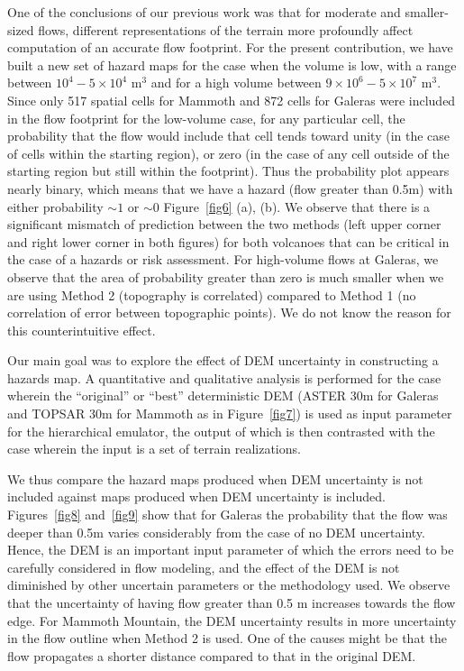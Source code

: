 \documentclass[12pt]{article}
\begin{document}
One of the conclusions of our previous work was that for moderate and
smaller-sized flows, different representations of the terrain more
profoundly affect computation of an accurate flow footprint.  For the
present contribution, we have built a new set of hazard maps for the
case when the volume is low, with a range between $10^4 - 5\times
10^4$ m$^3$ and for a high volume between $9\times 10^6 - 5\times
10^7$ m$^3$.  Since only 517 spatial cells for Mammoth and 872 cells
for Galeras were included in the flow footprint for the low-volume
case, for any particular cell, the probability that the flow would
include that cell tends toward unity (in the case of cells within the
starting region), or zero (in the case of any cell outside of the
starting region but still within the footprint).  Thus the probability
plot appears nearly binary, which means that we have a hazard (flow
greater than 0.5m) with either probability $\sim1$ or $\sim0$
Figure~\ref{fig6} (a), (b).  We observe that there is a significant
mismatch of prediction between the two methods (left upper corner and
right lower corner in both figures) for both volcanoes that can be
critical in the case of a hazards or risk assessment.  For high-volume
flows at Galeras, we observe that the area of probability greater than
zero is much smaller when we are using Method 2 (topography is
correlated) compared to Method 1 (no correlation of error between
topographic points). We do not know the reason for this
counterintuitive effect.

Our main goal was to explore the effect of DEM uncertainty in
constructing a hazards map.  A quantitative and qualitative analysis
is performed for the case wherein the ``original'' or ``best''
deterministic DEM (ASTER 30m for Galeras and TOPSAR 30m for Mammoth as
in Figure~\ref{fig7}) is used as input parameter for the hierarchical
emulator, the output of which is then contrasted with the case wherein
the input is a set of terrain realizations.

We thus compare the hazard maps produced when DEM uncertainty is not
included against maps produced when DEM uncertainty is included.
Figures~\ref{fig8} and~\ref{fig9} show that for Galeras the
probability that the flow was deeper than 0.5m varies considerably
from the case of no DEM uncertainty. Hence, the DEM is an important
input parameter of which the errors need to be carefully considered in
flow modeling, and the effect of the DEM is not diminished by other
uncertain parameters or the methodology used.  We observe that the
uncertainty of having flow greater than 0.5 m increases towards the
flow edge. For Mammoth Mountain, the DEM uncertainty results in more
uncertainty in the flow outline when Method 2 is used. One of the
causes might be that the flow propagates a shorter distance compared
to that in the original DEM.
\end{document}
